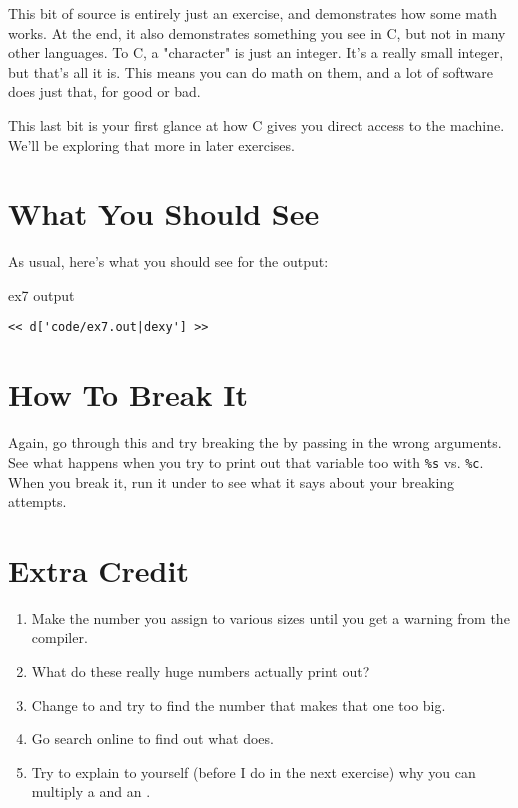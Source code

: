 This bit of source is entirely just an exercise, and demonstrates how
some math works.  At the end, it also demonstrates something you
see in C, but not in many other languages.  To C, a "character" is just an
integer.  It's a really small integer, but that's all it is.  This means
you can do math on them, and a lot of software does just that, for good
or bad.

This last bit is your first glance at how C gives you direct access to 
the machine.  We'll be exploring that more in later exercises.


\section{What You Should See}

As usual, here's what you should see for the output:

\begin{code}{ex7 output}
\begin{lstlisting}
<< d['code/ex7.out|dexy'] >>
\end{lstlisting}
\end{code}


\section{How To Break It}

Again, go through this and try breaking the  by passing in
the wrong arguments.  See what happens when you try to print out that
 variable too with \verb|%s| vs. \verb|%c|.  When you
break it, run it under  to see what it says about your
breaking attempts.

\section{Extra Credit}

\begin{enumerate}
\item Make the number you assign to  various 
    sizes until you get a warning from the compiler.
\item What do these really huge numbers actually print out?
\item Change  to  and try to find 
    the number that makes that one too big.
\item Go search online to find out what  does.
\item Try to explain to yourself (before I do in the next exercise)
    why you can multiply a  and an .
\end{enumerate}

